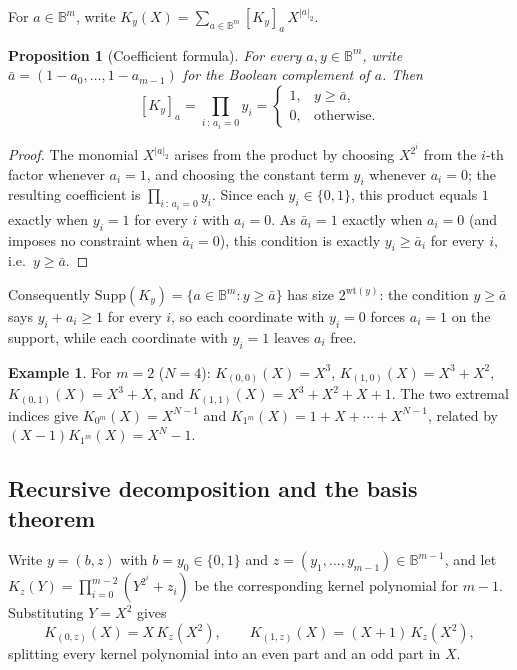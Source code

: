 \documentclass[preprint,3p,12pt,numbers]{elsarticle}
\newtheorem{proposition}[theorem]{Proposition}
\theoremstyle{definition}
\newtheorem{example}[theorem]{Example}
\theoremstyle{remark}
\newcommand{\wt}{\mathrm{wt}}
\begin{document}
For $a \in \mathbb{B}^m$, write $K_y(X) = \sum_{a \in \mathbb{B}^m}
[K_y]_a \, X^{|a|_2}$.

\begin{proposition}[Coefficient formula]
\label{prop:coeff-formula}
For every $a, y \in \mathbb{B}^m$, write $\bar a = (1-a_0,\dots,1-a_{m-1})$
for the Boolean complement of $a$. Then
\[
  [K_y]_a = \prod_{i \,:\, a_i = 0} y_i =
  \begin{cases} 1, & y \geq \bar a, \\ 0, & \text{otherwise.} \end{cases}
\]
\end{proposition}

\begin{proof}
The monomial $X^{|a|_2}$ arises from the product by choosing $X^{2^i}$
from the $i$-th factor whenever $a_i=1$, and choosing the constant term
$y_i$ whenever $a_i=0$; the resulting coefficient is
$\prod_{i \,:\, a_i=0} y_i$. Since each $y_i \in \{0,1\}$, this product
equals $1$ exactly when $y_i=1$ for every $i$ with $a_i=0$. As
$\bar a_i = 1$ exactly when $a_i=0$ (and imposes no constraint when
$\bar a_i=0$), this condition is exactly $y_i \geq \bar a_i$ for every
$i$, i.e.\ $y \geq \bar a$.
\end{proof}

Consequently $\mathrm{Supp}(K_y) = \{a \in \mathbb{B}^m : y \geq \bar a\}$
has size $2^{\wt(y)}$: the condition $y \geq \bar a$ says
$y_i + a_i \geq 1$ for every $i$, so each coordinate with $y_i=0$ forces
$a_i=1$ on the support, while each coordinate with $y_i=1$ leaves $a_i$
free.

\begin{example}
\label{ex:m2}
For $m=2$ ($N=4$): $K_{(0,0)}(X) = X^3$, $K_{(1,0)}(X) = X^3+X^2$,
$K_{(0,1)}(X) = X^3+X$, and $K_{(1,1)}(X) = X^3+X^2+X+1$. The two extremal
indices give $K_{0^m}(X) = X^{N-1}$ and
$K_{1^m}(X) = 1+X+\cdots+X^{N-1}$, related by
$(X-1)K_{1^m}(X) = X^N-1$.
\end{example}

\subsection{Recursive decomposition and the basis theorem}
\label{subsec:basis-thm}

Write $y = (b,z)$ with $b = y_0 \in \{0,1\}$ and
$z = (y_1,\dots,y_{m-1}) \in \mathbb{B}^{m-1}$, and let
$K_z(Y) = \prod_{i=0}^{m-2} (Y^{2^i}+z_i)$ be the corresponding kernel
polynomial for $m-1$. Substituting $Y=X^2$ gives
\begin{equation}
\label{eq:recursion}
  K_{(0,z)}(X) = X\, K_z(X^2), \qquad
  K_{(1,z)}(X) = (X+1)\, K_z(X^2),
\end{equation}
splitting every kernel polynomial into an even part and an odd part in $X$.
\end{document}

